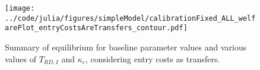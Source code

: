\documentclass[ecta,nameyear,final]{econsocart}
\theoremstyle{definition}
\begin{document}
\begin{figure}[]
	\centering
	\texttt{[image: ../code/julia/figures/simpleModel/calibrationFixed\_ALL\_welfarePlot\_entryCostsAreTransfers\_contour.pdf]}
	\caption{Summary of equilibrium for baseline parameter values and various values of $T_{RD,I}$ and $\kappa_c$, considering entry costs as transfers.}
	\label{calibration_ALL_welfarePlot_entryCostsAreTransfers}
\end{figure}



\newpage{} 
\end{document}
